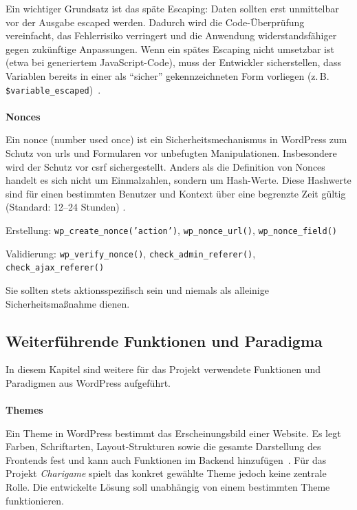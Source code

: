 Ein wichtiger Grundsatz ist das späte Escaping: Daten sollten erst unmittelbar vor der Ausgabe escaped werden.
Dadurch wird die Code-Überprüfung vereinfacht, das Fehlerrisiko verringert und die Anwendung widerstandsfähiger gegen zukünftige Anpassungen.
Wenn ein spätes Escaping nicht umsetzbar ist (etwa bei generiertem JavaScript-Code), muss der Entwickler sicherstellen, dass Variablen bereits in einer als \enquote{sicher} gekennzeichneten Form vorliegen (z.\,B. \texttt{\$variable\_escaped})~\cite{wordpress2024escapingcant}.
\\\\
\textbf{Nonces}

Ein \gls{nonce} (number used once) ist ein Sicherheitsmechanismus in WordPress zum Schutz von \gls{url}s und Formularen vor unbefugten Manipulationen.
Insbesondere wird der Schutz vor \gls{csrf} sichergestellt.
Anders als die Definition von Nonces handelt es sich nicht um Einmalzahlen, sondern um Hash-Werte.
Diese Hashwerte sind für einen bestimmten Benutzer und Kontext über eine begrenzte Zeit gültig (Standard: 12–24 Stunden) \cite{wordpress2024nonces}.

Erstellung: \texttt{wp\_create\_nonce('action')}, \texttt{wp\_nonce\_url()}, \texttt{wp\_nonce\_field()}

Validierung: \texttt{wp\_verify\_nonce()}, \texttt{check\_admin\_referer()}, \texttt{check\_ajax\_referer()}

Sie sollten stets aktionsspezifisch sein und niemals als alleinige Sicherheitsmaßnahme dienen.

\subsection{Weiterführende Funktionen und Paradigma}
In diesem Kapitel sind weitere für das Projekt verwendete Funktionen und Paradigmen aus WordPress aufgeführt.
\\
\\
\textbf{Themes}

Ein Theme in WordPress bestimmt das Erscheinungsbild einer Website.
Es legt Farben, Schriftarten, Layout-Strukturen sowie die gesamte Darstellung des Frontends fest und kann auch Funktionen im Backend hinzufügen~\cite{wordpress2024theme}.
Für das Projekt \textit{Charigame} spielt das konkret gewählte Theme jedoch keine zentrale Rolle.
Die entwickelte Lösung soll unabhängig von einem bestimmten Theme funktionieren.



